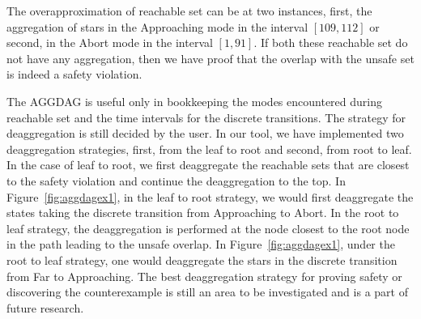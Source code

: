 \begin{example}
The overapproximation of reachable set can be at two instances, first, the aggregation of stars in the Approaching mode in the interval $[109, 112]$ or second, in the Abort mode in the interval $[1,91]$.  If both these reachable set do not have any aggregation, then we have proof that the overlap with the unsafe set is indeed a safety violation. 
\end{example}



The AGGDAG is useful only in bookkeeping the modes encountered during reachable set and the time intervals for the discrete transitions. The strategy for deaggregation is still decided by the user. In our tool, we have implemented two deaggregation strategies, first, from the leaf to root and second, from root to leaf. In the case of leaf to root, we first deaggregate the reachable sets that are closest to the safety violation and continue the deaggregation to the top. In Figure~\ref{fig:aggdagex1}, in the leaf to root strategy, we would first deaggregate the states taking the discrete transition from Approaching to Abort. In the root to leaf strategy, the deaggregation is performed at the node closest to the root node in the path leading to the unsafe overlap. In Figure~\ref{fig:aggdagex1}, under the root to leaf strategy, one would deaggregate the stars in the discrete transition from Far to Approaching. The best deaggregation strategy for proving safety or discovering the counterexample is still an area to be investigated and is a part of future research.






